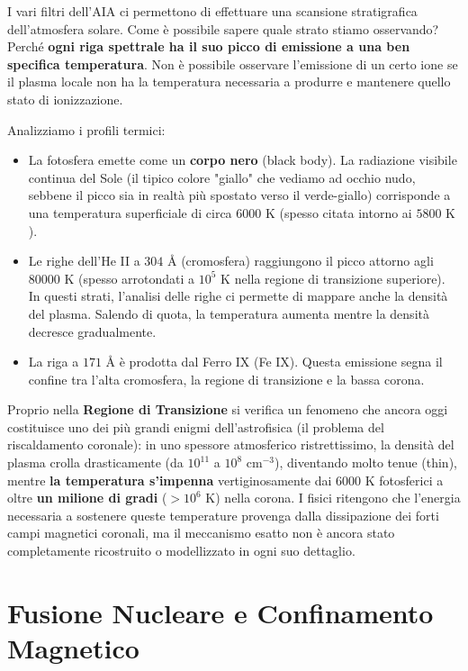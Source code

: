     I vari filtri dell'AIA ci permettono di effettuare una scansione stratigrafica dell'atmosfera solare. Come è possibile sapere quale strato stiamo osservando?
    Perché \textbf{ogni riga spettrale ha il suo picco di emissione a una ben specifica temperatura}. Non è possibile osservare l'emissione di un certo ione se il plasma locale non ha la temperatura necessaria a produrre e mantenere quello stato di ionizzazione.
    
    Analizziamo i profili termici:
    \begin{itemize}
        \item La fotosfera emette come un \textbf{corpo nero} (black body). La radiazione visibile continua del Sole (il tipico colore "giallo" che vediamo ad occhio nudo, sebbene il picco sia in realtà più spostato verso il verde-giallo) corrisponde a una temperatura superficiale di circa $6000\text{ K}$ (spesso citata intorno ai $5800\text{ K}$).
        \item Le righe dell'He II a $304\text{ \AA}$ (cromosfera) raggiungono il picco attorno agli $80000\text{ K}$ (spesso arrotondati a $10^5\text{ K}$ nella regione di transizione superiore). In questi strati, l'analisi delle righe ci permette di mappare anche la densità del plasma. Salendo di quota, la temperatura aumenta mentre la densità decresce gradualmente.
        \item La riga a $171\text{ \AA}$ è prodotta dal Ferro IX (Fe IX). Questa emissione segna il confine tra l'alta cromosfera, la regione di transizione e la bassa corona.
    \end{itemize}
    
    Proprio nella \textbf{Regione di Transizione} si verifica un fenomeno che ancora oggi costituisce uno dei più grandi enigmi dell'astrofisica (il problema del riscaldamento coronale): in uno spessore atmosferico ristrettissimo, la densità del plasma crolla drasticamente (da $10^{11}$ a $10^{8}\text{ cm}^{-3}$), diventando molto tenue (thin), mentre \textbf{la temperatura s'impenna} vertiginosamente dai $6000\text{ K}$ fotosferici a oltre \textbf{un milione di gradi} ($> 10^6\text{ K}$) nella corona.
    I fisici ritengono che l'energia necessaria a sostenere queste temperature provenga dalla dissipazione dei forti campi magnetici coronali, ma il meccanismo esatto non è ancora stato completamente ricostruito o modellizzato in ogni suo dettaglio.

\section{Fusione Nucleare e Confinamento Magnetico}

